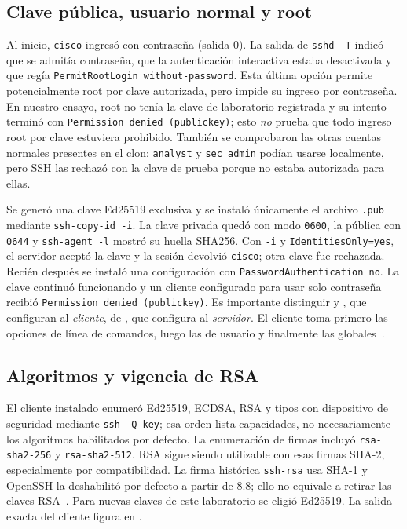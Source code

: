 \documentclass[11pt,a4paper]{article}
\begin{document}
\subsection{Clave pública, usuario normal y root}
Al inicio, \texttt{cisco} ingresó con contraseña (salida 0). La salida de
\texttt{sshd -T} indicó que se admitía contraseña, que la autenticación
interactiva estaba desactivada y que regía
\texttt{PermitRootLogin without-password}. Esta última opción permite
potencialmente root por clave autorizada, pero impide su ingreso por
contraseña. En nuestro ensayo, root no tenía la clave de laboratorio
registrada y su intento terminó con \texttt{Permission denied (publickey)};
esto \emph{no} prueba que todo ingreso root por clave estuviera prohibido.
También se comprobaron las otras cuentas normales presentes en el clon:
\texttt{analyst} y \texttt{sec\_admin} podían usarse localmente, pero SSH las
rechazó con la clave de prueba porque no estaba autorizada para ellas.

Se generó una clave Ed25519 exclusiva y se instaló únicamente el archivo
\texttt{.pub} mediante \texttt{ssh-copy-id -i}. La clave privada quedó con modo
\texttt{0600}, la pública con \texttt{0644} y \texttt{ssh-agent -l} mostró su
huella SHA256. Con \texttt{-i} y \texttt{IdentitiesOnly=yes}, el servidor
aceptó la clave y la sesión devolvió \texttt{cisco}; otra clave fue rechazada.
Recién después se instaló una configuración con
\texttt{PasswordAuthentication no}. La clave continuó funcionando y un
cliente configurado para usar solo contraseña recibió
\texttt{Permission denied (publickey)}. Es importante distinguir
 y , que configuran al
\emph{cliente}, de , que configura al
\emph{servidor}. El cliente toma primero las opciones de línea de comandos,
luego las de usuario y finalmente las globales~\cite{openssh-man}.

\subsection{Algoritmos y vigencia de RSA}
El cliente instalado enumeró Ed25519, ECDSA, RSA y tipos con dispositivo de
seguridad mediante \texttt{ssh -Q key}; esa orden lista capacidades, no
necesariamente los algoritmos habilitados por defecto. La enumeración de
firmas incluyó \texttt{rsa-sha2-256} y \texttt{rsa-sha2-512}. RSA sigue siendo
utilizable con esas firmas SHA-2, especialmente por compatibilidad. La firma
histórica \texttt{ssh-rsa} usa SHA-1 y OpenSSH la deshabilitó por defecto a
partir de 8.8; ello no equivale a retirar las claves RSA~\cite{openssh-rsa}.
Para nuevas claves de este laboratorio se eligió Ed25519. La salida exacta
del cliente figura en .
\end{document}
